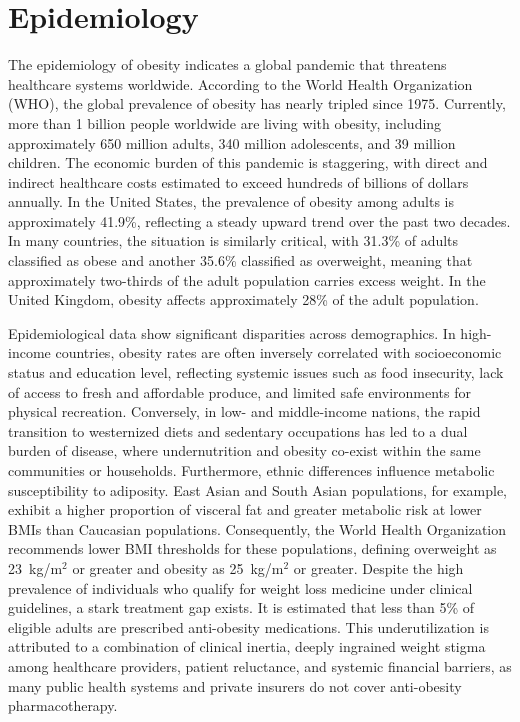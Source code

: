 \section*{Epidemiology}
The epidemiology of obesity indicates a global pandemic that threatens healthcare systems worldwide. According to the World Health Organization (WHO), the global prevalence of obesity has nearly tripled since 1975. Currently, more than 1 billion people worldwide are living with obesity, including approximately 650 million adults, 340 million adolescents, and 39 million children. The economic burden of this pandemic is staggering, with direct and indirect healthcare costs estimated to exceed hundreds of billions of dollars annually. In the United States, the prevalence of obesity among adults is approximately 41.9\%, reflecting a steady upward trend over the past two decades. In many countries, the situation is similarly critical, with 31.3\% of adults classified as obese and another 35.6\% classified as overweight, meaning that approximately two-thirds of the adult population carries excess weight. In the United Kingdom, obesity affects approximately 28\% of the adult population.

Epidemiological data show significant disparities across demographics. In high-income countries, obesity rates are often inversely correlated with socioeconomic status and education level, reflecting systemic issues such as food insecurity, lack of access to fresh and affordable produce, and limited safe environments for physical recreation. Conversely, in low- and middle-income nations, the rapid transition to westernized diets and sedentary occupations has led to a dual burden of disease, where undernutrition and obesity co-exist within the same communities or households. Furthermore, ethnic differences influence metabolic susceptibility to adiposity. East Asian and South Asian populations, for example, exhibit a higher proportion of visceral fat and greater metabolic risk at lower BMIs than Caucasian populations. Consequently, the World Health Organization recommends lower BMI thresholds for these populations, defining overweight as 23~kg/m$^2$ or greater and obesity as 25~kg/m$^2$ or greater. Despite the high prevalence of individuals who qualify for weight loss medicine under clinical guidelines, a stark treatment gap exists. It is estimated that less than 5\% of eligible adults are prescribed anti-obesity medications. This underutilization is attributed to a combination of clinical inertia, deeply ingrained weight stigma among healthcare providers, patient reluctance, and systemic financial barriers, as many public health systems and private insurers do not cover anti-obesity pharmacotherapy.

